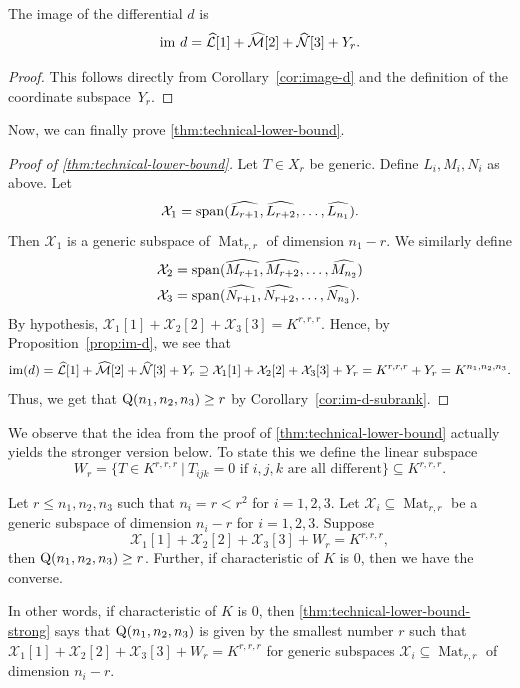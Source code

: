 \documentclass[11pt]{article}
\theoremstyle{definition}
\theoremstyle{remark}
\newcommand{\gensubrank}{{\rm Q}}
\newcommand{\spa}{{\rm span}}
\newcommand{\Mat}{\operatorname{Mat}}
\newcommand{\im}{{\rm im}}
\begin{document}
%


\begin{proposition} \label{prop:im-d}
The image of the differential $d$ is
$$
\im\ d = \mathcal{\widehat{L}}[1] + \mathcal{\widehat{M}}[2] + \mathcal{\widehat{N}}[3] + Y_r.
$$
\end{proposition}

\begin{proof}
This follows directly from Corollary~\ref{cor:image-d} and the definition of the coordinate subspace~$Y_r$.
\end{proof}


Now, we can finally prove \autoref{thm:technical-lower-bound}.

\begin{proof} [Proof of \autoref{thm:technical-lower-bound}]
Let $T \in X_r$ be generic. Define $L_i, M_i, N_i$ as above. Let
\[
\mathcal{X}_1 = \spa (\widehat{L_{r+1}}, \widehat{L_{r+2}}, \dots, \widehat{L_{n_1}}).
\]
Then $\mathcal{X}_1$ is a generic subspace of $\Mat_{r,r}$ of dimension $n_1 - r$. We similarly define 
\begin{align*}
\mathcal{X}_2 &= \spa (\widehat{M_{r+1}}, \widehat{M_{r+2}}, \dots, \widehat{M_{n_2}})\\
\mathcal{X}_3 &= \spa (\widehat{N_{r+1}}, \widehat{N_{r+2}}, \dots, \widehat{N_{n_3}}).
\end{align*}
By hypothesis, $\mathcal{X}_1[1] + \mathcal{X}_2[2] + \mathcal{X}_3[3] = K^{r,r,r}$. Hence, by Proposition~\ref{prop:im-d}, we see that 
\[
\im(d) = \mathcal{\widehat{L}}[1] + \mathcal{\widehat{M}}[2] + \mathcal{\widehat{N}}[3] + Y_r \supseteq \mathcal{X}_1[1] + \mathcal{X}_2[2] + \mathcal{X}_3[3] + Y_r = K^{r,r,r} + Y_r = K^{n_1,n_2,n_3}.
\]
Thus, we get that $\gensubrank(n_1,n_2,n_3) \geq r$  by Corollary~\ref{cor:im-d-subrank}.
\end{proof}

%
%

%

%

We observe that the idea from the proof of \autoref{thm:technical-lower-bound} actually yields the stronger version below. To state this we define the linear subspace
\[
W_r =  \{T \in K^{r,r,r} \ | \ T_{ijk} = 0 \text{ if  $i,j,k$ are all different} \} \subseteq K^{r,r,r}.
\]\par%
\begin{theorem}\label{thm:technical-lower-bound-strong}
Let $r \leq n_1,n_2,n_3$ such that $n_i = r < r^2$ for $i = 1,2,3$. Let $\mathcal{X}_i \subseteq \Mat_{r,r}$ be a generic subspace of dimension $n_i - r$ for $i = 1,2,3$. Suppose 
$$
\mathcal{X}_1[1] + \mathcal{X}_2[2] + \mathcal{X}_3[3] + W_r = K^{r,r,r},
$$
then $\gensubrank(n_1,n_2,n_3) \geq r$.
Further, if characteristic of $K$ is $0$, then we have the converse.
\end{theorem}
In other words, if characteristic of $K$ is $0$, then \autoref{thm:technical-lower-bound-strong} says that $\gensubrank(n_1,n_2,n_3)$ is given by the smallest number $r$ such that 
%
%
$\mathcal{X}_1[1] + \mathcal{X}_2[2] + \mathcal{X}_3[3] + W_r = K^{r,r,r}$ for generic subspaces $\mathcal{X}_i \subseteq \Mat_{r,r}$ of dimension $n_i -r$.
%
%
\end{document}
